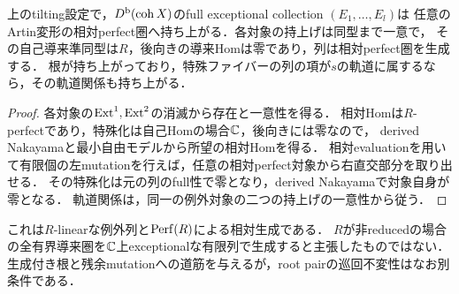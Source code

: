 \begin{proposition}[Full例外列の相対持上げ]\label{prop:relative-exceptionals}
上のtilting設定で，$D^{\mathrm b}(\operatorname{coh} X)$のfull exceptional collection $(E_1,\ldots,E_l)$は
任意のArtin変形の相対perfect圏へ持ち上がる．各対象の持上げは同型まで一意で，
その自己導来準同型は$R$，後向きの導来Homは零であり，列は相対perfect圏を生成する．
根が持ち上がっており，特殊ファイバーの列の項が$s$の軌道に属するなら，その軌道関係も持ち上がる．
\end{proposition}
\begin{proof}
各対象の$\operatorname{Ext}^1,\operatorname{Ext}^2$の消滅から存在と一意性を得る．
相対Homは$R$-perfectであり，特殊化は自己Homの場合$\mathbb C$，後向きには零なので，
derived Nakayamaと最小自由モデルから所望の相対Homを得る．
相対evaluationを用いて有限個の左mutationを行えば，任意の相対perfect対象から右直交部分を取り出せる．
その特殊化は元の列のfull性で零となり，derived Nakayamaで対象自身が零となる．
軌道関係は，同一の例外対象の二つの持上げの一意性から従う．
\end{proof}

これは$R$-linearな例外列と$\operatorname{Perf}(R)$による相対生成である．
$R$が非reducedの場合の全有界導来圏を$\mathbb C$上exceptionalな有限列で生成すると主張したものではない．
生成付き根と残余mutationへの道筋を与えるが，root pairの巡回不変性はなお別条件である．
